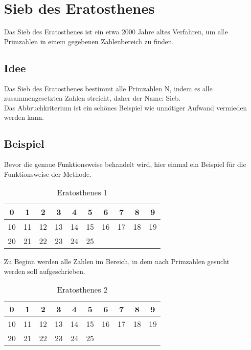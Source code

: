 

	\section{Sieb des Eratosthenes}
	 \label{sec:eratosthenes}
	Das Sieb des Eratosthenes ist ein etwa 2000 Jahre altes Verfahren, um alle Primzahlen in einem gegebenen Zahlenbereich zu finden. 
	\subsection{Idee}
	Das Sieb des Eratosthenes bestimmt alle Primzahlen N, indem es alle zusammengesetzten Zahlen streicht, daher der Name: Sieb.\\
	Das Abbruchkriterium ist ein sch\"ones Beispiel wie unn\"otiger Aufwand vermieden werden kann.
	\subsection{Beispiel}
	Bevor die genaue Funktionsweise behandelt wird, hier einmal ein Beispiel f\"ur die Funktionsweise der Methode.\\
	\begin{table}[!ht] 
		\centering
		
		\begin{tabular}{|c|c|c|c|c|c|c|c|c|c|}
			\hline
			0  &  1 &  2 &  3 &  4 &  5 &  6 &  7 &  8 &  9 \\
			\hline
			10 & 11 & 12 & 13 & 14 & 15 & 16 & 17 & 18 & 19 \\
			\hline
			20 & 21 & 22 & 23 & 24 & 25 &  &  &  &  \\
			\hline
		\end{tabular}
		\caption{Eratosthenes 1}
		\label{tab:eratosthenes1}
	\end{table}
	
	Zu Beginn werden alle Zahlen im Bereich, in dem nach Primzahlen gesucht werden soll aufgeschrieben.
	
	\begin{table}[!ht] 
		\centering
		\begin{tabular}{|c|c|c|c|c|c|c|c|c|c|}
			\hline
			\cellcolor{red}0  &  \cellcolor{red}1 &  2 &  3 &  4 &  5 &  6 &  7 &  8 &  9 \\
			\hline
			10 & 11 & 12 & 13 & 14 & 15 & 16 & 17 & 18 & 19 \\
			\hline
			20 & 21 & 22 & 23 & 24 & 25 &  &  &  &  \\
			\hline
		\end{tabular}
		\caption{Eratosthenes 2}
		\label{tab:eratosthenes2}
	\end{table}
	
